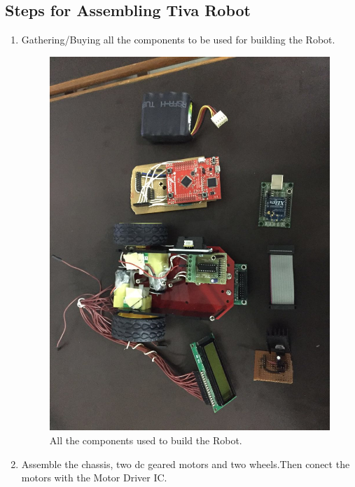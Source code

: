 \documentclass[a4paper,12pt,oneside]{book}
\begin{document}
\subsection{Steps for Assembling Tiva Robot}
\begin{enumerate}
\item Gathering/Buying all the components to be used for building the Robot.
\begin{figure}[h]
        \centering
        \includegraphics[scale=0.16]{all_components}
        \caption{All the components used to build the Robot.}
      \end{figure}
\item Assemble the chassis, two dc geared motors and two wheels.Then conect the motors with the Motor Driver IC.
\begin{figure}[h]
        \centering

\end{figure}
\end{enumerate}
\end{document}
